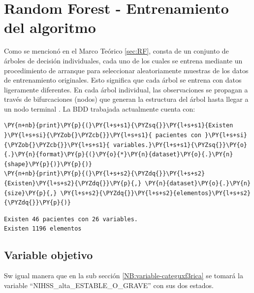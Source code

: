     \hypertarget{random-forest---entrenamiento-del-algoritmo}{%
\section{Random Forest - Entrenamiento del algoritmo}\label{random-forest---entrenamiento-del-algoritmo}}

	Como se mencionó en el Marco Teórico \ref{sec:RF}, consta de un conjunto de árboles de decisión individuales, cada uno de los cuales se entrena mediante un procedimiento de arranque para seleccionar aleatoriamente muestras de los datos de entrenamiento originales. Esto significa que cada árbol se entrena con datos ligeramente diferentes. En cada árbol individual, las observaciones se propagan a través de bifurcaciones (nodos) que generan la estructura del árbol hasta llegar a un nodo terminal \cite{cien2001}.
	La BDD trabajada actualmente cuenta con:

    \begin{tcolorbox}[breakable, size=fbox, boxrule=1pt, pad at break*=1mm,colback=cellbackground, colframe=cellborder]
\begin{Verbatim}[commandchars=\\\{\}]
\PY{n+nb}{print}\PY{p}{(}\PY{l+s+s1}{\PYZsq{}}\PY{l+s+s1}{Existen }\PY{l+s+si}{\PYZob{}\PYZcb{}}\PY{l+s+s1}{ pacientes con }\PY{l+s+si}{\PYZob{}\PYZcb{}}\PY{l+s+s1}{ variables.}\PY{l+s+s1}{\PYZsq{}}\PY{o}{.}\PY{n}{format}\PY{p}{(}\PY{o}{*}\PY{n}{dataset}\PY{o}{.}\PY{n}{shape}\PY{p}{)}\PY{p}{)}
\PY{n+nb}{print}\PY{p}{(}\PY{l+s+s2}{\PYZdq{}}\PY{l+s+s2}{Existen}\PY{l+s+s2}{\PYZdq{}}\PY{p}{,} \PY{n}{dataset}\PY{o}{.}\PY{n}{size}\PY{p}{,} \PY{l+s+s2}{\PYZdq{}}\PY{l+s+s2}{elementos}\PY{l+s+s2}{\PYZdq{}}\PY{p}{)}
\end{Verbatim}
\end{tcolorbox}

    \begin{Verbatim}[commandchars=\\\{\}]
Existen 46 pacientes con 26 variables.
Existen 1196 elementos
    \end{Verbatim}

    \hypertarget{variable-categuxf3rica}{%
\subsection{Variable objetivo}\label{variable-categuxf3rica}}

 Sw igual manera que en la sub sección \ref{NB:variable-categuxf3rica} se tomará la variable ``NIHSS\_alta\_ESTABLE\_O\_GRAVE'' con sus dos estados.
 
